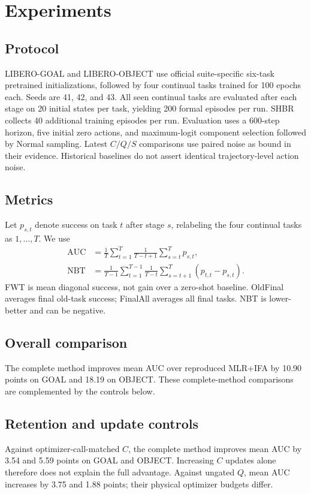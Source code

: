 \section{Experiments}
\subsection{Protocol}
LIBERO-GOAL and LIBERO-OBJECT \citep{liu2023libero} use official suite-specific
six-task pretrained initializations, followed by four continual tasks trained
for 100 epochs each. Seeds are 41, 42, and 43. All seen continual tasks are
evaluated after each stage on 20 initial states per task, yielding 200 formal
episodes per run. SHBR collects 40 additional training episodes per run.
Evaluation uses a 600-step horizon, five initial zero actions, and maximum-logit
component selection followed by Normal sampling. Latest $C/Q/S$ comparisons
use paired noise as bound in their evidence. Historical baselines do not
assert identical trajectory-level action noise.
\subsection{Metrics}
Let $p_{s,t}$ denote success on task $t$ after stage $s$, relabeling the four
continual tasks as $1,\ldots,T$. We use
\begin{align}
\mathrm{AUC}&=\frac1T\sum_{t=1}^T\frac1{T-t+1}\sum_{s=t}^T p_{s,t},\\
\mathrm{NBT}&=\frac1{T-1}\sum_{t=1}^{T-1}\frac1{T-t}
\sum_{s=t+1}^T(p_{t,t}-p_{s,t}).
\end{align}
FWT is mean diagonal success, not gain over a zero-shot baseline.
OldFinal averages final old-task success; FinalAll averages all final tasks.
NBT is lower-better and can be negative.
\subsection{Overall comparison}

The complete method improves mean AUC over reproduced MLR+IFA by 10.90
points on GOAL and 18.19 on OBJECT. These complete-method comparisons
are complemented by the controls below.
\subsection{Retention and update controls}

Against optimizer-call-matched $C$, the complete method improves mean AUC
by 3.54 and 5.59 points on GOAL and OBJECT. Increasing $C$ updates alone
therefore does not explain the full advantage. Against ungated $Q$, mean
AUC increases by 3.75 and 1.88 points; their physical optimizer budgets differ.
